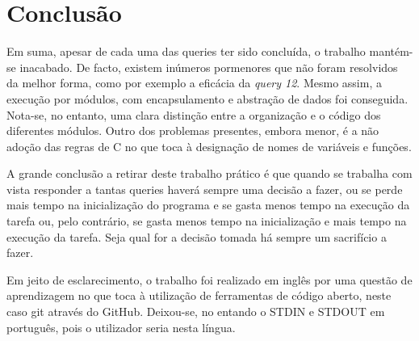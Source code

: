 \documentclass[10pt] {article}
\begin{document}
\newpage
\section{Conclusão}

\indent\par Em suma, apesar de cada uma das queries ter sido concluída, o trabalho mantém-se inacabado. De 
facto, existem inúmeros pormenores que não foram resolvidos da melhor forma, como por exemplo a 
eficácia da \emph{query 12}. Mesmo assim, a execução por módulos, com encapsulamento e abstração de dados 
foi conseguida. Nota-se, no entanto, uma clara distinção entre a organização e o código dos diferentes módulos. 
Outro dos problemas presentes, embora menor, é a não adoção das regras de C no que toca à designação de 
nomes de variáveis e funções.
\par A grande conclusão a retirar deste trabalho prático é que quando se trabalha com vista responder a tantas 
queries haverá sempre uma decisão a fazer, ou se perde mais tempo na inicialização do programa e se gasta 
menos tempo na execução da tarefa ou, pelo contrário, se gasta menos tempo na inicialização e mais tempo na 
execução da tarefa. Seja qual for a decisão tomada há sempre um sacrifício a fazer.
\par Em jeito de esclarecimento, o trabalho foi realizado em inglês por uma questão de aprendizagem no que toca à 
utilização de ferramentas de código aberto, neste caso git através do GitHub. Deixou-se, no entando o STDIN e 
STDOUT em português, pois o utilizador seria nesta língua.   
\end{document}
